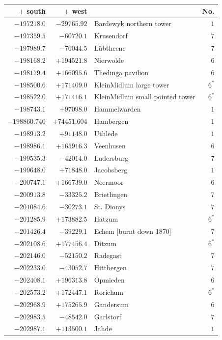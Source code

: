 \clearpage{}%
\begin{center}\begingroup\fontsize{8}{9}\selectfont
\setlength{\tabcolsep}{4pt}
\begin{tabular}{r|r|p{170pt}|r}\hline
\(+\) south&\(+\) west&&No.\\\hline
\(-197218.0\)&\(-29765.92\)&Bardewyk northern tower&\(1\)\\
\(-197359.5\)&\(-60720.1\)&Krusendorf&\(7\)\\
\(-197989.7\)&\(-76044.5\)&Lübtheene&\(7\)\\
\(-198168.2\)&\(+194521.8\)&Nierwolde&\(6\)\\
\(-198179.4\)&\(+166095.6\)&Thedinga pavilion&\(6\)\\
\(-198500.6\)&\(+171409.0\)&KleinMidlum large tower&\(6^{*}\)\\
\(-198522.0\)&\(+171416.1\)&KleinMidlum small pointed tower&\(6^{*}\)\\
\(-198743.1\)&\(+97098.0\)&Hammelwarden&\(1\)\\
\(-198860.740\)&\(+74451.604\)&Hambergen&\(1\)\\
\(-198913.2\)&\(+91148.0\)&Uthlede&\(1\)\\
\(-198986.1\)&\(+165916.3\)&Veenhusen&\(6\)\\
\(-199535.3\)&\(-42014.0\)&Ludersburg&\(7\)\\
\(-199648.0\)&\(+71848.0\)&Jacobsberg&\(1\)\\
\(-200747.1\)&\(+166739.0\)&Neermoor&\(6\)\\
\(-200913.8\)&\(-33325.2\)&Brietlingen&\(7\)\\
\(-201084.6\)&\(-30273.1\)&St. Dionys&\(7\)\\
\(-201285.9\)&\(+173882.5\)&Hatzum&\(6^{*}\)\\
\(-201426.4\)&\(-39229.1\)&Echem [burnt down 1870]&\(7\)\\
\(-202108.6\)&\(+177456.4\)&Ditzum&\(6^{*}\)\\
\(-202146.0\)&\(-52150.2\)&Radegast&\(7\)\\
\(-202233.0\)&\(-43052.7\)&Hittbergen&\(7\)\\
\(-202408.1\)&\(+196313.8\)&Opmieden&\(6\)\\
\(-202573.2\)&\(+172447.1\)&Rorichum&\(6^{*}\)\\
\(-202968.9\)&\(+175265.9\)&Gandersum&\(6\)\\
\(-202983.5\)&\(-48542.0\)&Garlstorf&\(7\)\\
\(-202987.1\)&\(+113500.1\)&Jahde&\(1\)\\

\end{tabular}
\end{center}
